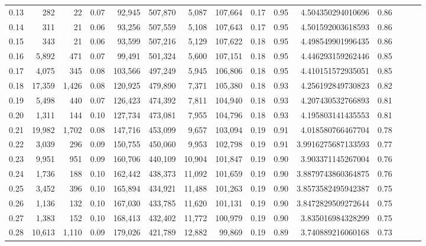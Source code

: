 \begin{tabular}{rrrrrrrrrrrrrrr}
0.13 &     282 &     22 &  0.07 &   92,945 &  507,870 &    5,087 &  107,664 &  0.17 &  0.95 &     4.504350294010696 &      0.86 \\
0.14 &     311 &     21 &  0.06 &   93,256 &  507,559 &    5,108 &  107,643 &  0.17 &  0.95 &     4.501592003618593 &      0.86 \\
0.15 &     343 &     21 &  0.06 &   93,599 &  507,216 &    5,129 &  107,622 &  0.18 &  0.95 &     4.498549901996435 &      0.86 \\
0.16 &   5,892 &    471 &  0.07 &   99,491 &  501,324 &    5,600 &  107,151 &  0.18 &  0.95 &     4.446293159262446 &      0.85 \\
0.17 &   4,075 &    345 &  0.08 &  103,566 &  497,249 &    5,945 &  106,806 &  0.18 &  0.95 &     4.410151572935051 &      0.85 \\
0.18 &  17,359 &  1,426 &  0.08 &  120,925 &  479,890 &    7,371 &  105,380 &  0.18 &  0.93 &     4.256192849730823 &      0.82 \\
0.19 &   5,498 &    440 &  0.07 &  126,423 &  474,392 &    7,811 &  104,940 &  0.18 &  0.93 &     4.207430532766893 &      0.81 \\
0.20 &   1,311 &    144 &  0.10 &  127,734 &  473,081 &    7,955 &  104,796 &  0.18 &  0.93 &     4.195803141435553 &      0.81 \\
0.21 &  19,982 &  1,702 &  0.08 &  147,716 &  453,099 &    9,657 &  103,094 &  0.19 &  0.91 &     4.018580766467704 &      0.78 \\
0.22 &   3,039 &    296 &  0.09 &  150,755 &  450,060 &    9,953 &  102,798 &  0.19 &  0.91 &    3.9916275687133593 &      0.77 \\
0.23 &   9,951 &    951 &  0.09 &  160,706 &  440,109 &   10,904 &  101,847 &  0.19 &  0.90 &     3.903371145267004 &      0.76 \\
0.24 &   1,736 &    188 &  0.10 &  162,442 &  438,373 &   11,092 &  101,659 &  0.19 &  0.90 &    3.8879743860364875 &      0.76 \\
0.25 &   3,452 &    396 &  0.10 &  165,894 &  434,921 &   11,488 &  101,263 &  0.19 &  0.90 &    3.8573582495942387 &      0.75 \\
0.26 &   1,136 &    132 &  0.10 &  167,030 &  433,785 &   11,620 &  101,131 &  0.19 &  0.90 &    3.8472829509272644 &      0.75 \\
0.27 &   1,383 &    152 &  0.10 &  168,413 &  432,402 &   11,772 &  100,979 &  0.19 &  0.90 &     3.835016984328299 &      0.75 \\
0.28 &  10,613 &  1,110 &  0.09 &  179,026 &  421,789 &   12,882 &   99,869 &  0.19 &  0.89 &     3.740889216060168 &      0.73 \\

\end{tabular}
